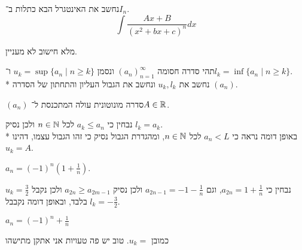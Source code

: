 \Subquestion{}
נחשב את האינטגרל הבא כתלות ב־$I_n$.
\[
	\int \frac{Ax + B}{{(x^2 + bx + c)}^n} dx
\]

מלא חישוב לא מעניין.

\Question{}
תהי סדרה חסומה ${(a_n)}_{n = 1}^\infty$ ונסמן $u_k = \sup\{ a_n \mid n \ge k \}$ ו־$l_k = \inf\{ a_n \mid n \ge k \}$. \\*
נחשב את $u_k, l_k$ ונחשב את הגבול העליון והתחתון של הסדרה $(a_n)$.

\Subquestion{}
$(a_n)$ סדרה מונוטונית עולה המתכנסת ל־$A \in \mathbb{R}$.

נבחין כי $a_k \le a_n$ לכל $n \in \mathbb{N}$ ולכן נסיק $l_k = a_k$. \\*
באופן דומה נראה כי $a_n < L$ לכל $n \in \mathbb{N}$, ומהגדרת הגבול נסיק כי זהו הגבול עצמו, דהינו $u_k = A$.

\Subquestion{}
$a_n = {(-1)}^n (1 + \frac{1}{n})$.

נבחין כי $a_{2n} = 1 + \frac{1}{n}$, וגם $a_{2n - 1} = -1 - \frac{1}{n}$ ולכן נסיק $a_{2n} \ge a_{2m - 1}$ ולכן נקבל $u_k = \frac{3}{2}$ בלבד, ובאופן דומה נקבבל $l_k = -\frac{3}{2}$.

\Subquestion{}
$a_n = {(-1)}^n + \frac{1}{n}$

כמובן $u_k = $.
טוב יש פה טעויות אני אתקן מתישהו

